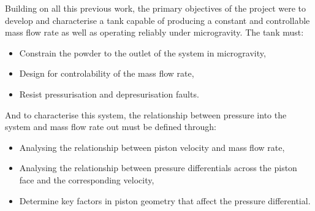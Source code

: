 Building on all this previous work, the primary objectives of the project were to develop and characterise a tank capable of producing a constant and controllable mass flow rate as well as operating reliably under microgravity. The tank must:
\begin{itemize}
    \item Constrain the powder to the outlet of the system in microgravity,
    \item Design for controlability of the mass flow rate,
    \item Resist pressurisation and depresurisation faults.
\end{itemize}
And to characterise this system, the relationship between pressure into the system and mass flow rate out must be defined through:
\begin{itemize}
    \item Analysing the relationship between piston velocity and mass flow rate,
    \item Analysing the relationship between pressure differentials across the piston face and the corresponding velocity,
    \item Determine key factors in piston geometry that affect the pressure differential.
\end{itemize}